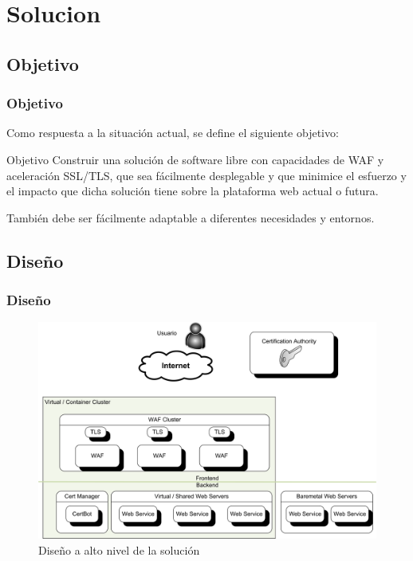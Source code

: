 \section{Solucion}
\subsection{Objetivo}
\begin{frame}[shrink]
  \frametitle{Objetivo}
  Como respuesta a la situación actual, se define el siguiente objetivo:
  \begin{block}{Objetivo}
    Construir una solución de software libre con capacidades de WAF y aceleración SSL/TLS, que sea  fácilmente desplegable y que minimice el esfuerzo y el impacto que dicha
    solución tiene sobre la plataforma web actual o futura.
    \par También debe ser fácilmente adaptable a diferentes necesidades y entornos.
  \end{block}
\end{frame}

\subsection{Diseño}
\begin{frame}[shrink]
  \frametitle{Diseño}
  \begin{figure}
    \includegraphics[width=\textwidth]{fig/Diagram_HLD}
    \caption{\small{Diseño a alto nivel de la solución}}
  \end{figure}
\end{frame}

